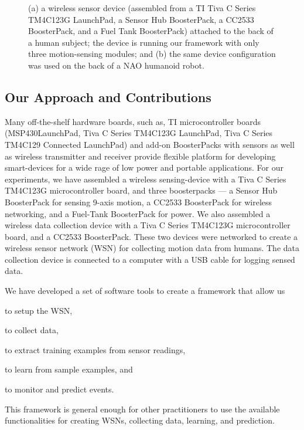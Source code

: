 \documentclass{IEEEtran}
\begin{document}
\begin{figure}[htb]
\centering
{}
\qquad
{} 
\caption{(a) a wireless sensor device (assembled from a TI Tiva C Series  TM4C123G LaunchPad, a Sensor Hub BoosterPack, a CC2533 BoosterPack, and a Fuel Tank BoosterPack) attached to the back of a human subject; the device is running our framework  with only three motion-sensing modules; and (b) the 
same device configuration was used on the back of a NAO humanoid robot.}
 \label{fig:deviceWithSubjects}
\end{figure}

\subsection{Our Approach and Contributions}

Many off-the-shelf hardware boards, such as, TI microcontroller boards (MSP430{\texttrademark}LaunchPad, Tiva{\texttrademark} C Series 
TM4C123G LaunchPad, Tiva C Series TM4C129 Connected LaunchPad) and add-on  BoosterPacks   with sensors as well as  wireless transmitter and receiver  provide flexible platform for 
developing smart-devices for a wide rage of low power and portable applications. For our experiments, 
we have assembled a wireless sensing-device with a Tiva C Series TM4C123G microcontroller board, and three 
boosterpacks --- a
Sensor Hub BoosterPack  for sensing 9-axis motion,  a CC2533  BoosterPack for wireless 
networking, and a Fuel-Tank BoosterPack for power. We also assembled a wireless data collection device with a Tiva C Series TM4C123G microcontroller board, and a  CC2533  BoosterPack. These two devices were networked to create a wireless sensor network (WSN) for 
collecting motion data from  humans.
The data collection device is connected to a computer with a USB cable for logging sensed data.   

We have developed a set of software tools to create a framework that allow us
\begin{inparaenum}[($i$)] \item  to setup the WSN, \item to collect data, \item to extract training examples from sensor readings, \item to learn from sample examples, and \item 
to monitor and predict events. \end{inparaenum} This framework is general enough for other practitioners to use the
available functionalities for creating WSNs, collecting data, learning, and prediction.
\end{document}
